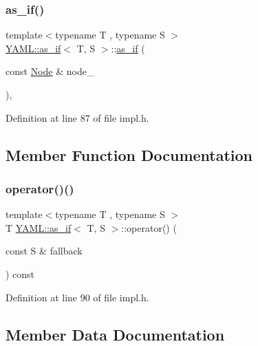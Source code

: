 \subsubsection{\texorpdfstring{as\_if()}{as\_if()}}
{\footnotesize\ttfamily template$<$typename T , typename S $>$ \\
\mbox{\hyperlink{struct_y_a_m_l_1_1as__if}{Y\+A\+M\+L\+::as\+\_\+if}}$<$ T, S $>$\+::\mbox{\hyperlink{struct_y_a_m_l_1_1as__if}{as\+\_\+if}} (\begin{DoxyParamCaption}\item[{const \mbox{\hyperlink{class_y_a_m_l_1_1_node}{Node}} \&}]{node\+\_\+ }\end{DoxyParamCaption})\hspace{0.3cm}{\ttfamily [inline]}, {\ttfamily [explicit]}}



Definition at line 87 of file impl.\+h.



\subsection{Member Function Documentation}
\mbox{\label{struct_y_a_m_l_1_1as__if_ad38e1f8b65ab2b4348883c32df8463bc}} 
\subsubsection{\texorpdfstring{operator()()}{operator()()}}
{\footnotesize\ttfamily template$<$typename T , typename S $>$ \\
T \mbox{\hyperlink{struct_y_a_m_l_1_1as__if}{Y\+A\+M\+L\+::as\+\_\+if}}$<$ T, S $>$\+::operator() (\begin{DoxyParamCaption}\item[{const S \&}]{fallback }\end{DoxyParamCaption}) const\hspace{0.3cm}{\ttfamily [inline]}}



Definition at line 90 of file impl.\+h.



\subsection{Member Data Documentation}
\mbox{\label{struct_y_a_m_l_1_1as__if_a3500e52aaa8e80fdd9be76e14286453a}} 

